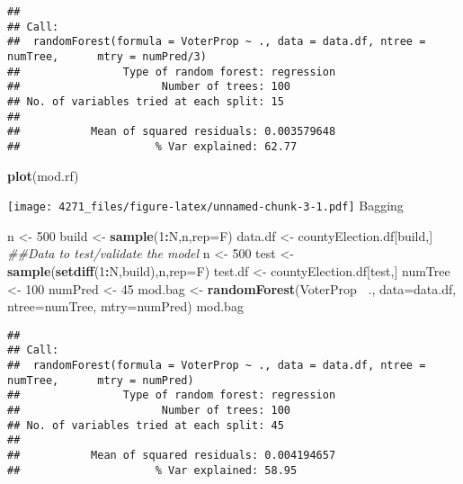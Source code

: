 \documentclass[]{article}
\newenvironment{Shaded}{\begin{snugshade}}{\end{snugshade}}
\newcommand{\CommentTok}[1]{\textcolor[rgb]{0.56,0.35,0.01}{\textit{#1}}}
\newcommand{\DataTypeTok}[1]{\textcolor[rgb]{0.13,0.29,0.53}{#1}}
\newcommand{\DecValTok}[1]{\textcolor[rgb]{0.00,0.00,0.81}{#1}}
\newcommand{\KeywordTok}[1]{\textcolor[rgb]{0.13,0.29,0.53}{\textbf{#1}}}
\newcommand{\NormalTok}[1]{#1}
\newcommand{\OperatorTok}[1]{\textcolor[rgb]{0.81,0.36,0.00}{\textbf{#1}}}
\newcommand{\StringTok}[1]{\textcolor[rgb]{0.31,0.60,0.02}{#1}}
\begin{document}
\begin{verbatim}
## 
## Call:
##  randomForest(formula = VoterProp ~ ., data = data.df, ntree = numTree,      mtry = numPred/3) 
##                Type of random forest: regression
##                      Number of trees: 100
## No. of variables tried at each split: 15
## 
##           Mean of squared residuals: 0.003579648
##                     % Var explained: 62.77
\end{verbatim}

\begin{Shaded}
\begin{Highlighting}[]
\KeywordTok{plot}\NormalTok{(mod.rf)}
\end{Highlighting}
\end{Shaded}

\texttt{[image: 4271\_files/figure-latex/unnamed-chunk-3-1.pdf]} Bagging

\begin{Shaded}
\begin{Highlighting}[]
\NormalTok{n <-}\StringTok{ }\DecValTok{500}
\NormalTok{build <-}\StringTok{ }\KeywordTok{sample}\NormalTok{(}\DecValTok{1}\OperatorTok{:}\NormalTok{N,n,}\DataTypeTok{rep=}\NormalTok{F)}
\NormalTok{data.df <-}\StringTok{ }\NormalTok{countyElection.df[build,]}
\CommentTok{##Data to test/validate the model}
\NormalTok{n <-}\StringTok{ }\DecValTok{500}
\NormalTok{test <-}\StringTok{ }\KeywordTok{sample}\NormalTok{(}\KeywordTok{setdiff}\NormalTok{(}\DecValTok{1}\OperatorTok{:}\NormalTok{N,build),n,}\DataTypeTok{rep=}\NormalTok{F)}
\NormalTok{test.df <-}\StringTok{ }\NormalTok{countyElection.df[test,]}
\NormalTok{numTree <-}\StringTok{ }\DecValTok{100}
\NormalTok{numPred <-}\StringTok{ }\DecValTok{45}
\NormalTok{mod.bag <-}\StringTok{ }\KeywordTok{randomForest}\NormalTok{(VoterProp }\OperatorTok{~}\NormalTok{.,}
                        \DataTypeTok{data=}\NormalTok{data.df, }
                        \DataTypeTok{ntree=}\NormalTok{numTree, }
                        \DataTypeTok{mtry=}\NormalTok{numPred)}
\NormalTok{mod.bag}
\end{Highlighting}
\end{Shaded}

\begin{verbatim}
## 
## Call:
##  randomForest(formula = VoterProp ~ ., data = data.df, ntree = numTree,      mtry = numPred) 
##                Type of random forest: regression
##                      Number of trees: 100
## No. of variables tried at each split: 45
## 
##           Mean of squared residuals: 0.004194657
##                     % Var explained: 58.95
\end{verbatim}
\end{document}
